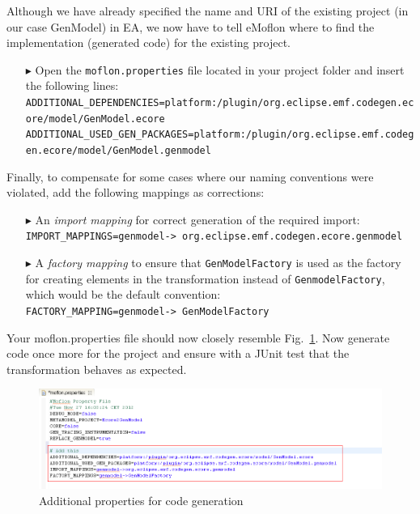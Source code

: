 Although we have already specified the name and URI of the existing project (in our case \textsf{GenModel}) in EA, we now have to tell eMoflon where to find the implementation (generated code) for the existing project. 
\begin{enumerate}
\item[$\blacktriangleright$] Open the \texttt{moflon.properties} file located in your project folder and insert the following lines:\\
\texttt{{\tiny ADDITIONAL\_DEPENDENCIES=platform:/plugin/org.eclipse.emf.codegen.ecore/model/GenModel.ecore}}\\
\texttt{{\tiny ADDITIONAL\_USED\_GEN\_PACKAGES=platform:/plugin/org.eclipse.emf.codegen.ecore/model/GenModel.genmodel}}
\end{enumerate}

Finally, to compensate for some cases where our naming conventions were violated, add the following mappings as corrections:

\begin{enumerate}
\item[$\blacktriangleright$] An \emph{import mapping} for correct generation of the required import:\\
\texttt{\tiny IMPORT\_MAPPINGS=genmodel-> org.eclipse.emf.codegen.ecore.genmodel}
\item [$\blacktriangleright$] A \emph{factory mapping} to ensure that \texttt{GenModelFactory} is used as the factory for creating elements in the transformation instead of \texttt{Genmodel\-Factory}, which would be the default convention:\\
\texttt{\tiny FACTORY\_MAPPING=genmodel-> GenModelFactory}
\end{enumerate}

Your \textsf{moflon.properties} file should now closely resemble Fig.~\ref{fig_mofProp}.
Now generate code once more for the project and ensure with a JUnit test that the transformation behaves as expected.

\begin{figure}[htbp]
\begin{center}  \includegraphics[width=1.3\textwidth]{pics/Ecore2GenModel_Bilder/9_mofProperties.png}
  \caption{Additional properties for code generation}  
  \label{fig_mofProp}
\end{center}
\end{figure}  







